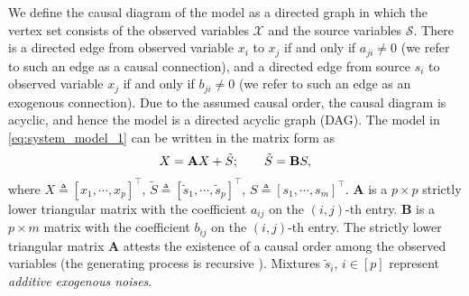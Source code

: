 \documentclass[12pt]{article}
\newcommand{\bA}{\mathbf{A}}
\newcommand{\bB}{\mathbf{B}}
\begin{document}

We define the causal diagram of the model as a directed graph in which the vertex set consists of the observed variables $\mathcal{X}$ and the source variables $\mathcal{S}$. There is a directed edge from observed variable $x_i$ to $x_j$ if and only if $a_{ji}\neq 0$ (we refer to such an edge as a causal connection), and a directed edge from source $s_i$ to observed variable $x_j$ if and only if $b_{ji}\neq 0$ (we refer to such an edge as an exogenous connection).
Due to the assumed causal order, the causal diagram is acyclic, and hence the model is a directed acyclic graph (DAG).
The model in \eqref{eq:system_model_1} can be written in the matrix form as 
\vspace{-2mm}
\begin{align}
\label{eq:system_model_2}
X=\bA X+  \tilde{S};\qquad \tilde{S} =\bB S, \vspace{-2mm}
\end{align}
where $X\triangleq[x_1,\cdots,x_p]^\top$, $\tilde{S}\triangleq [\tilde{s}_1,\cdots,\tilde{s}_p]^\top$, $S \triangleq [s_1,\cdots,s_m]^\top$. $\bA$ is a $p\times p$ strictly lower triangular matrix with the coefficient $a_{ij}$ on the $(i,j)$-th entry. $\bB$ is a $p\times m$ matrix with the coefficient $ b_{ij}$ on the $(i,j)$-th entry. The strictly lower triangular matrix $\bA$ attests the existence of a causal order among the observed variables (the generating process is recursive \citep{bollen1989structural}). Mixtures $\tilde{s}_i$, $i\in[p]$ represent {\it{additive exogenous noises}}. 
\vspace{-2mm}
\end{document}

